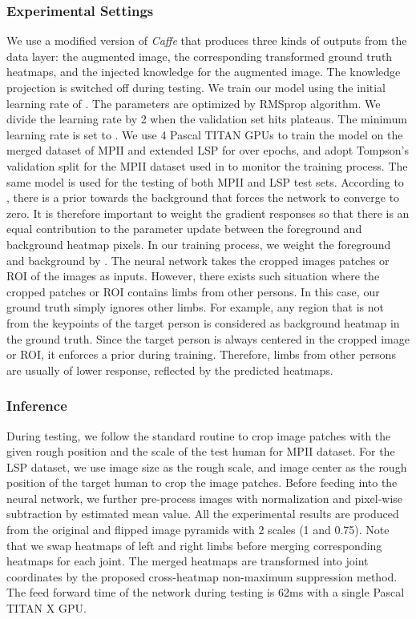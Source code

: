 \documentclass[journal ]{IEEEtran}
\begin{document}
\subsubsection{Experimental Settings}
We use a modified version of \textit{Caffe}\cite{jia2014caffe} that produces three kinds of outputs from the data layer: the augmented image, the corresponding transformed ground truth heatmaps, and the injected knowledge for the augmented image. The knowledge projection is switched off during testing.  
We train our model using the initial learning rate of  . The parameters are optimized by RMSprop \cite{tieleman2012lecture} algorithm. We divide the learning rate by 2 when the validation set hits plateaus. The minimum learning rate is set to .
We use 4 Pascal TITAN GPUs to train the model on the merged dataset of MPII and extended LSP for over  epochs, and adopt Tompson's validation split for the MPII dataset used in \cite{tompson2014joint} to monitor the training process.
The same model is used for the testing of both MPII and LSP test sets.
According to \cite{pinheiro2014recurrent}, there is a prior towards the background that forces the network to converge to zero. It is therefore important to weight the gradient responses so that there is an equal contribution to the parameter update between the foreground and background heatmap pixels. In our training process, we weight the foreground and background by . 
The neural network takes the cropped images patches or ROI of the images as inputs. However, there exists such situation where the cropped patches or ROI contains limbs from other persons. In this case, our ground truth simply ignores other limbs. For example, any region that is not from the keypoints of the target person is considered as background heatmap in the ground truth. Since the target person is always centered in the cropped image or ROI, it enforces a prior during training. Therefore, limbs from other persons are usually of lower response, reflected by the predicted heatmaps. 

\subsubsection{Inference}
During testing, we follow the standard routine to crop image patches with the given rough position and the scale of the test human for MPII dataset. For the LSP dataset, we use image size as the rough scale, and image center as the rough position of the target human to crop the image patches.
Before feeding into the neural network, we further pre-process images with normalization and pixel-wise subtraction by estimated mean value. 
All the experimental results are produced from the original and flipped image pyramids with 2 scales (1 and 0.75). Note that we swap heatmaps of left and right limbs before merging corresponding heatmaps for each joint. The merged heatmaps are transformed into joint coordinates by the proposed cross-heatmap non-maximum suppression method. 
The feed forward time of the network during testing is 62ms with a single Pascal TITAN X GPU.
\end{document}
